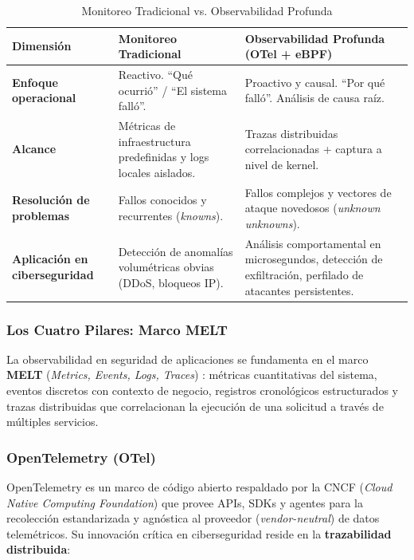 \documentclass[12pt, a4paper]{article}
\begin{document}
\begin{table}[h!]
\centering
\caption{Monitoreo Tradicional vs. Observabilidad Profunda}
\label{tab:monvsobs}
\begin{tabularx}{\textwidth}{>{\bfseries}p{3cm} X X}
\toprule
Dimensión & Monitoreo Tradicional & Observabilidad Profunda (OTel + eBPF) \\
\midrule
Enfoque operacional & Reactivo. ``Qué ocurrió'' / ``El sistema falló''. &
  Proactivo y causal. ``Por qué falló''. Análisis de causa raíz. \\[4pt]
Alcance & Métricas de infraestructura predefinidas y logs locales aislados. &
  Trazas distribuidas correlacionadas + captura a nivel de kernel. \\[4pt]
Resolución de problemas & Fallos conocidos y recurrentes (\textit{knowns}). &
  Fallos complejos y vectores de ataque novedosos (\textit{unknown unknowns}). \\[4pt]
Aplicación en ciberseguridad & Detección de anomalías volumétricas obvias
  (DDoS, bloqueos IP). &
  Análisis comportamental en microsegundos, detección de exfiltración,
  perfilado de atacantes persistentes. \\
\bottomrule
\end{tabularx}
\end{table}

\subsubsection{Los Cuatro Pilares: Marco MELT}

La observabilidad en seguridad de aplicaciones se fundamenta en el marco
\textbf{MELT} (\textit{Metrics, Events, Logs, Traces}) \cite{newrelic2025}:
métricas cuantitativas del sistema, eventos discretos con contexto de negocio,
registros cronológicos estructurados y trazas distribuidas que correlacionan
la ejecución de una solicitud a través de múltiples servicios.

\subsubsection{OpenTelemetry (OTel)}

OpenTelemetry \cite{opentelemetry} es un marco de código abierto respaldado por
la CNCF (\textit{Cloud Native Computing Foundation}) que provee APIs, SDKs y
agentes para la recolección estandarizada y agnóstica al proveedor
(\textit{vendor-neutral}) de datos telemétricos. Su innovación crítica en
ciberseguridad reside en la \textbf{trazabilidad distribuida}:
\end{document}

